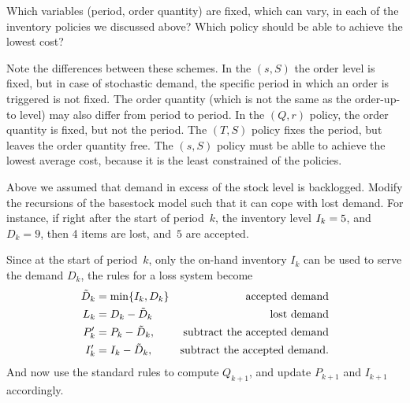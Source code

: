 \documentclass[stochastic-or.tex]{subfiles}
\begin{document}
\begin{exercise}
  Which variables (period, order quantity) are fixed, which can  vary, in each of the inventory policies  we discussed above? Which policy should be able to achieve the lowest cost?
  \begin{solution}
  Note the differences between these schemes.
In the $(s,S)$ the order level is fixed, but in case of stochastic demand, the specific period in which an order is triggered is not fixed.
The order quantity (which is not the same as the order-up-to level) may also differ from period to period.
In the $(Q,r)$ policy, the order quantity is fixed, but not the period.
The $(T,S)$ policy fixes the period, but leaves the order quantity free.
The $(s,S)$ policy must be ablle to achieve the lowest average cost, because it is the least constrained of the policies.
  \end{solution}
\end{exercise}



\begin{exercise}
Above we assumed that demand in excess of the  stock level is backlogged.
Modify the recursions of the basestock model such that it can cope with lost demand.
For instance, if right after the start of period~$k$, the inventory level $I_{k}= 5$, and $D_k=9$, then 4 items are lost, and~$5$ are accepted.
\begin{solution}
Since at the start of period~$k$, only the on-hand inventory $I_{k}$ can be used to serve the demand $D_{k}$, the rules for a loss system become
\begin{align*}
\tilde D_k &= \min\{I_k, D_k\} & \text{accepted demand}\\
L_k &= D_{k} - \tilde D_{k} & \text{lost demand}\\
P_k' &= P_{k} - \tilde D_k, &\text{subtract the accepted demand}\\
I_k' &= I_{k} - \tilde D_k, &\text{subtract the accepted demand}.
\end{align*}
And now use the standard rules to compute $Q_{k+1}$, and update $P_{k+1}$ and $I_{k+1}$ accordingly.
\end{solution}
\end{exercise}





\end{document}
